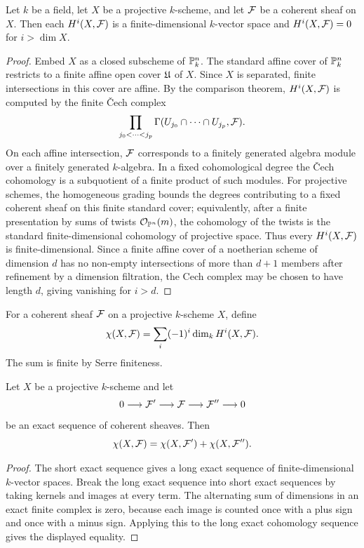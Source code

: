 \begin{theorem}
Let \(k\) be a field, let \(X\) be a projective \(k\)-scheme, and let \(\mathcal{F}\) be
a coherent sheaf on \(X\).  Then each \(H^i(X,\mathcal{F})\) is a finite-dimensional
\(k\)-vector space and \(H^i(X,\mathcal{F})=0\) for \(i>\dim X\).
\end{theorem}

\begin{proof}
Embed \(X\) as a closed subscheme of \(\mathbb{P}^n_k\).  The standard affine cover of
\(\mathbb{P}^n_k\) restricts to a finite affine open cover \(\mathfrak{U}\) of \(X\).  Since
\(X\) is separated, finite intersections in this cover are affine.  By the
comparison theorem, \(H^i(X,\mathcal{F})\) is computed by the finite \v{C}ech complex
\[
    \prod_{j_0<\cdots<j_p}
    \Gamma(U_{j_0}\cap\cdots\cap U_{j_p},\mathcal{F}).
\]
On each affine intersection, \(\mathcal{F}\) corresponds to a finitely generated algebra
module over a finitely generated \(k\)-algebra.  In a fixed cohomological degree
the \v{C}ech cohomology is a subquotient of a finite product of such modules.
For projective schemes, the homogeneous grading bounds the degrees contributing
to a fixed coherent sheaf on this finite standard cover; equivalently, after a
finite presentation by sums of twists \(\mathcal{O}_{\mathbb{P}^n}(m)\), the cohomology of
the twists is the standard finite-dimensional cohomology of projective space.
Thus every \(H^i(X,\mathcal{F})\) is finite-dimensional.  Since a finite affine cover of
a noetherian scheme of dimension \(d\) has no non-empty intersections of more
than \(d+1\) members after refinement by a dimension filtration, the Cech
complex may be chosen to have length \(d\), giving vanishing for \(i>d\).
\end{proof}

\begin{definition}
For a coherent sheaf \(\mathcal{F}\) on a projective \(k\)-scheme \(X\), define
\[
    \chi(X,\mathcal{F})=\sum_i (-1)^i\dim_k H^i(X,\mathcal{F}).
\]
The sum is finite by Serre finiteness.
\end{definition}

\begin{proposition}
Let \(X\) be a projective \(k\)-scheme and let
\[
    0\longrightarrow \mathcal{F}'\longrightarrow \mathcal{F}\longrightarrow \mathcal{F}''
    \longrightarrow0
\]
be an exact sequence of coherent sheaves.  Then
\[
    \chi(X,\mathcal{F})=\chi(X,\mathcal{F}')+\chi(X,\mathcal{F}'').
\]
\end{proposition}

\begin{proof}
The short exact sequence gives a long exact sequence of finite-dimensional
\(k\)-vector spaces.  Break the long exact sequence into short exact sequences
by taking kernels and images at every term.  The alternating sum of dimensions
in an exact finite complex is zero, because each image is counted once with a
plus sign and once with a minus sign.  Applying this to the long exact
cohomology sequence gives the displayed equality.
\end{proof}

